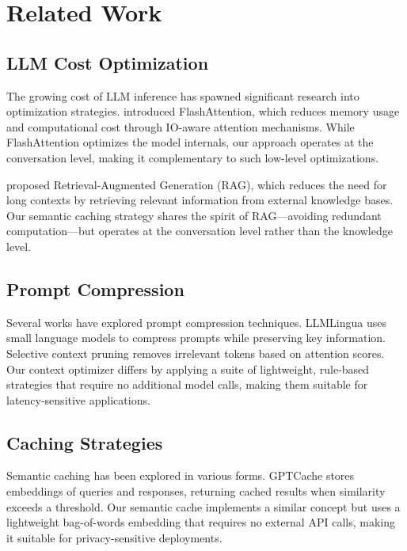 \section{Related Work}
\label{sec:related_work}

\subsection{LLM Cost Optimization}

The growing cost of LLM inference has spawned significant research into optimization strategies. \citet{dao2022} introduced FlashAttention, which reduces memory usage and computational cost through IO-aware attention mechanisms. While FlashAttention optimizes the model internals, our approach operates at the conversation level, making it complementary to such low-level optimizations.

\citet{lewis2020} proposed Retrieval-Augmented Generation (RAG), which reduces the need for long contexts by retrieving relevant information from external knowledge bases. Our semantic caching strategy shares the spirit of RAG---avoiding redundant computation---but operates at the conversation level rather than the knowledge level.

\subsection{Prompt Compression}

Several works have explored prompt compression techniques. LLMLingua uses small language models to compress prompts while preserving key information. Selective context pruning removes irrelevant tokens based on attention scores. Our context optimizer differs by applying a suite of lightweight, rule-based strategies that require no additional model calls, making them suitable for latency-sensitive applications.

\subsection{Caching Strategies}

Semantic caching has been explored in various forms. GPTCache stores embeddings of queries and responses, returning cached results when similarity exceeds a threshold. Our semantic cache implements a similar concept but uses a lightweight bag-of-words embedding that requires no external API calls, making it suitable for privacy-sensitive deployments.

